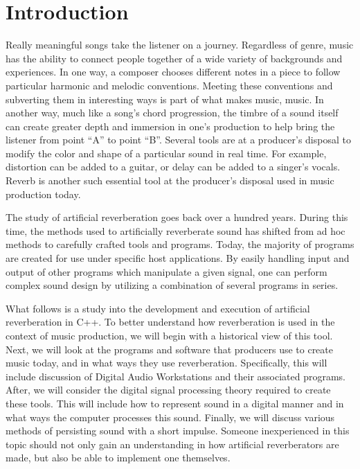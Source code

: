 \chapter{Introduction}\label{intro}
\hspace*{-0.155cm}Really meaningful songs take the listener on a journey. Regardless of genre, music has the ability to connect people together of a wide variety of backgrounds and experiences. In one way, a composer chooses different notes in a piece to follow particular harmonic and melodic conventions. Meeting these conventions and subverting them in interesting ways is part of what makes music, music. In another way, much like a song's chord progression, the timbre of a sound itself can create greater depth and immersion in one's production to help bring the listener from point ``A'' to point ``B''. Several tools are at a producer's disposal to modify the color and shape of a particular sound in real time. For example, distortion can be added to a guitar, or delay can be added to a singer's vocals. Reverb is another such essential tool at the producer's disposal used in music production today.

The study of artificial reverberation goes back over a hundred years. During this time, the methods used to artificially reverberate sound has shifted from ad hoc methods to carefully crafted tools and programs. Today, the majority of programs are created for use under specific host applications. By easily handling input and output of other programs which manipulate a given signal, one can perform complex sound design by utilizing a combination of several programs in series.

What follows is a study into the development and execution of artificial reverberation in C++. To better understand how reverberation is used in the context of music production, we will begin with a historical view of this tool. Next, we will look at the programs and software that producers use to create music today, and in what ways they use reverberation. Specifically, this will include discussion of Digital Audio Workstations and their associated programs. After, we will consider the digital signal processing theory required to create these tools. This will include how to represent sound in a digital manner and in what ways the computer processes this sound. Finally, we will discuss various methods of persisting sound with a short impulse. Someone inexperienced in this topic should not only gain an understanding in how artificial reverberators are made, but also be able to implement one themselves.
